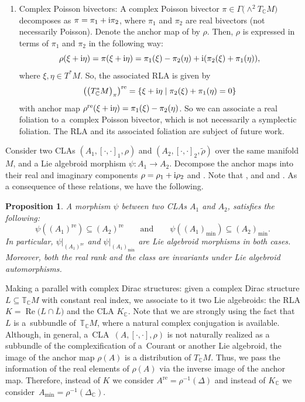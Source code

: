 \documentclass[pdftex]{sigma}
\numberwithin{equation}{section}
\newtheorem{Proposition}[Theorem]{Proposition}
 { \theoremstyle{definition}
\newtheorem{Definition}[Theorem]{Definition}
\newtheorem{Note}[Theorem]{Note}
\newtheorem{Example}[Theorem]{Example}
\newtheorem{Examples}[Theorem]{Examples}
\newtheorem{Remark}[Theorem]{Remark} }
\newcommand{\C}{{\mathbb{C}}}
\newcommand{\T}{\mathbb{T}}
\DeclareMathOperator{\re}{Re}
\DeclareMathOperator{\real}{re}
\begin{document}
\begin{Examples}
\begin{enumerate}
In particular, $A$ has constant real rank if and only if $A$ is a regular RLA.
\item Complex Poisson bivectors: A complex Poisson bivector $\pi\in \Gamma\bigl(\wedge^2 T_{\C}M\bigr)$ decomposes as $\pi=\pi_1+{\rm i}\pi_2$, where $\pi_1$ and $\pi_2$ are real bivectors (not necessarily Poisson). Denote the anchor map of \smash{$\bigl(T_{\C}^*M\bigr)_{\pi}$} by $\rho$. Then, $\rho$ is expressed in terms of $\pi_1$ and $\pi_2$ in the following way:
\[\rho(\xi+{\rm i}\eta)=\pi(\xi+{\rm i}\eta)=\pi_1(\xi)-\pi_2(\eta)+{\rm i}(\pi_2(\xi)+\pi_1(\eta)),\]
where $\xi, \eta\in T^*M$.
So, the associated RLA is given by
\[\bigl(\bigl(T_{\C}^*M\bigr)_{\pi}\bigr)^{\real}=\{ \xi+{\rm i}\eta\mid \pi_2(\xi)+\pi_1(\eta)=0\}\]
with anchor map $\rho^{\real}(\xi+{\rm i}\eta)=\pi_1(\xi)-\pi_2(\eta)$. So we can associate a real foliation to a~complex Poisson bivector, which is not necessarily a symplectic foliation.
The RLA \smash{$\bigl(\bigl(\bigl(T_{\C}^*M\bigr)_{\pi}\bigr)^{\real}, [\cdot,\cdot]^{\real}, \rho^{\real}\bigr)$} and its associated foliation are subject of future work.
\end{enumerate}
  \end{Examples}
Consider two CLAs $(A_1, [\cdot,\cdot]_1, \rho)$ and $(A_2, [\cdot,\cdot]_2, \widetilde{\rho})$ over the same manifold $M$, and a Lie algebroid morphism $\psi\colon A_1\to A_2$. Decompose the anchor maps into their real and imaginary components $\rho=\rho_1+{\rm i}\rho_2$ and . Note that , and  and . As a consequence of these relations, we have the following.
\begin{Proposition}
A morphism $\psi$ between two CLAs $A_1$ and $A_2$, satisfies the following:
\[\psi((A_1)^{\real})\subseteq (A_2)^{\real} \qquad\text{and}\qquad \psi((A_1)_{\min})\subseteq (A_2)_{\min}.\]
In particular, {$\psi|_{(A_1)^{\real}}$} and {$\psi|_{(A_1)_{\min}}$} are Lie algebroid morphisms in both cases. Moreover, both the real rank and the class are invariants under Lie algebroid automorphisms.
\end{Proposition}
\begin{Remark}
   Making a parallel with complex Dirac structures: given a complex Dirac structure $L\subseteq\T_{\C}M$ with constant real index, we associate to it two Lie algebroids: the RLA $K=\re\bigl(L\cap\overline{L}\bigr)$ and the CLA $K_{\C}$. Note that we are strongly using the fact that $L$ is a~subbundle of~$\T_{\C} M$, where a natural complex conjugation is available. Although, in general, a~CLA~$(A,[\cdot,\cdot], \rho)$ is not naturally realized as a subbundle of the complexification of a~Courant or another Lie algebroid, the image of the anchor map $\rho(A)$ is a distribution of $T_{\C}M$. Thus, we pass the information of the real elements of $\rho(A)$ via the inverse image of the anchor map. Therefore, instead of $K$ we consider $A^{\real}=\rho^{-1}(\Delta)$ and instead of $K_{\C}$ we consider~${A_{\min}=\rho^{-1}({\Delta_{\C}})}$.
\end{Remark}
\end{document}
